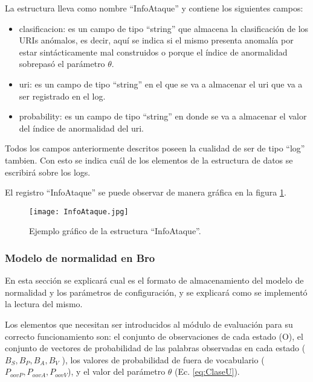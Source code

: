 La estructura lleva como nombre ``InfoAtaque'' y contiene los siguientes campos:

\begin{itemize}
\item clasificacion: es un campo de tipo ``string'' que almacena la clasificación de los URIs anómalos, es decir, aquí se indica si el mismo presenta anomalía por estar sintácticamente mal construidos o porque el índice de anormalidad sobrepasó el parámetro $\theta$.
\item uri: es un campo de tipo ``string'' en el que se va a almacenar el uri que va a ser registrado en el log.
\item probability: es un campo de tipo ``string'' en donde se va a almacenar el valor del índice de anormalidad del uri.
\end{itemize}

Todos los campos anteriormente descritos poseen la cualidad de ser de tipo ``log'' tambien. Con esto se indica cuál de los elementos de la estructura de datos se escribirá sobre los logs.

    El registro ``InfoAtaque'' se puede observar de manera gráfica en la figura \ref{fig:InfoAtaque}. 
    
\begin{figure}[tb]
\begin{center}
\texttt{[image: InfoAtaque.jpg]}
\caption{Ejemplo gráfico de la estructura ``InfoAtaque''.}
\label{fig:InfoAtaque}
\end{center}
\end{figure}	
    
\subsubsection{Modelo de normalidad en Bro}
\label{sec:lecturaModelo}

En esta sección se explicará cual es el formato de almacenamiento del
modelo de normalidad y los parámetros de configuración, y se explicará como
se implementó la lectura del mismo.

Los elementos que necesitan ser introducidos al módulo de evaluación para su correcto funcionamiento son: el conjunto de observaciones de cada estado (O), el conjunto de vectores de probabilidad de las palabras observadas en cada estado ( $B_{S}, B_{P}, B_{A}, B_{V}$ ), los
valores de probabilidad de fuera de vocabulario ($P_{oovP}, P_{oovA}, P_{oovV}$), y el valor del parámetro $\theta$ (Ec. \ref{eq:ClaseU}).

